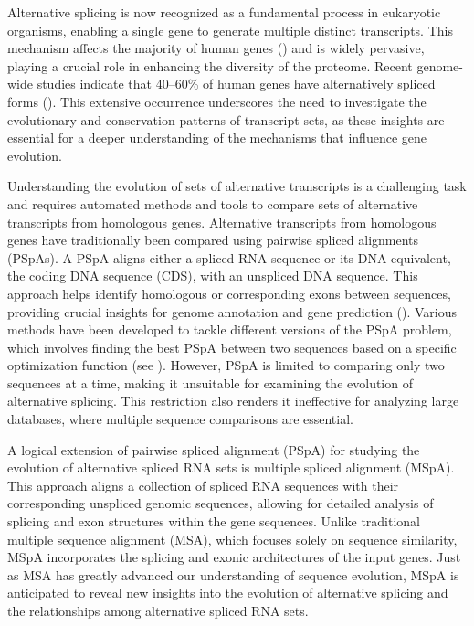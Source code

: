 Alternative splicing is now recognized as a fundamental process in eukaryotic organisms, enabling a single 
gene to generate multiple distinct transcripts. This mechanism affects the majority of human genes 
(\textit{\citep{harrow2006gencode, tress2007implications, kim2008alternative, wang2008alternative, chen2009mechanisms}}) 
and is widely pervasive, playing a crucial role in enhancing the diversity of
the proteome. 
Recent genome-wide studies indicate that 40--60\% of human genes have alternatively spliced forms (\textit{\citep{modrek2002genomic}}). 
This extensive occurrence underscores the need to investigate the evolutionary and conservation patterns of transcript sets, as these 
insights are essential for a deeper understanding of the mechanisms that influence gene evolution.


Understanding the evolution of sets of alternative transcripts is a challenging task and requires automated methods and tools to compare
sets of alternative transcripts from homologous genes. 
Alternative transcripts from homologous genes have traditionally been compared using pairwise spliced 
alignments (PSpAs). A PSpA aligns either a spliced RNA sequence or its DNA equivalent, the coding DNA 
sequence (CDS), with an unspliced DNA sequence. This approach helps identify homologous or corresponding 
exons between sequences, providing crucial insights for genome annotation and gene prediction
(\textit{\citep{stanke2006augustus, dunne2018omgene}}). Various methods have been developed to tackle 
different versions of the PSpA problem, which involves finding the best PSpA between two sequences based 
on a specific optimization function (see \textit{\citep{jammali2019splicedfamalign}}). However, PSpA is limited to 
comparing only two sequences at a time, making it unsuitable for examining the evolution of alternative splicing. 
This restriction also renders it ineffective for analyzing large databases, where multiple sequence comparisons are 
essential.

A logical extension of pairwise spliced alignment (PSpA) for studying the evolution of alternative spliced RNA sets is 
multiple spliced alignment (MSpA). This approach aligns a collection of spliced RNA sequences with their corresponding 
unspliced genomic sequences, allowing for detailed analysis of splicing and exon structures within the gene sequences. 
Unlike traditional multiple sequence alignment (MSA), which focuses solely on sequence similarity, MSpA incorporates the 
splicing and exonic architectures of the input genes. Just as MSA has greatly advanced our understanding of sequence 
evolution, MSpA is anticipated to reveal new insights into the evolution of alternative splicing and the relationships 
among alternative spliced RNA sets.

